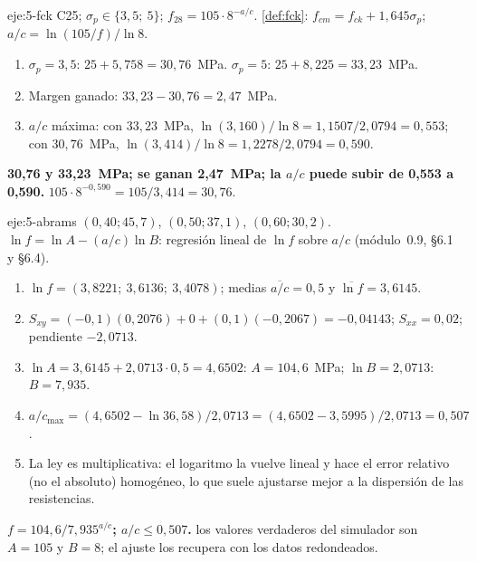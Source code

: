 \begin{solucion}{eje:5-fck}
\datos C25; $\sigma_p\in\{3{,}5;\ 5\}$; $f_{28}=105\cdot8^{-a/c}$.
\planteamiento \cref{def:fck}: $f_{cm}=f_{ck}+1{,}645\sigma_p$; $a/c=\ln(105/f)/\ln8$.
\pasos
\begin{enumerate}[label=\arabic*.]
  \item $\sigma_p=3{,}5$: $25+5{,}758=30{,}76$~MPa. $\sigma_p=5$: $25+8{,}225=33{,}23$~MPa.
  \item Margen ganado: $33{,}23-30{,}76=2{,}47$~MPa.
  \item $a/c$ máxima: con $33{,}23$~MPa, $\ln(3{,}160)/\ln8=1{,}1507/2{,}0794=0{,}553$; con $30{,}76$~MPa, $\ln(3{,}414)/\ln 8=1{,}2278/2{,}0794=0{,}590$.
\end{enumerate}
\resultado \textbf{30,76 y 33,23~MPa; se ganan 2,47~MPa; la $a/c$ puede subir de 0,553 a 0,590.}
\comprobacion $105\cdot8^{-0{,}590}=105/3{,}414=30{,}76$.
\end{solucion}

\begin{solucion}{eje:5-abrams}
\datos $(0{,}40;45{,}7)$, $(0{,}50;37{,}1)$, $(0{,}60;30{,}2)$.
\planteamiento $\ln f=\ln A-(a/c)\ln B$: regresión lineal de $\ln f$ sobre $a/c$ (módulo~0.9, §6.1 y §6.4).
\pasos
\begin{enumerate}[label=\arabic*.]
  \item $\ln f=(3{,}8221;\ 3{,}6136;\ 3{,}4078)$; medias $\overline{a/c}=0{,}5$ y $\overline{\ln f}=3{,}6145$.
  \item $S_{xy}=(-0{,}1)(0{,}2076)+0+(0{,}1)(-0{,}2067)=-0{,}04143$; $S_{xx}=0{,}02$; pendiente $-2{,}0713$.
  \item $\ln A=3{,}6145+2{,}0713\cdot0{,}5=4{,}6502$: $A=104{,}6$~MPa; $\ln B=2{,}0713$: $B=7{,}935$.
  \item $a/c_{\max}=(4{,}6502-\ln36{,}58)/2{,}0713=(4{,}6502-3{,}5995)/2{,}0713=0{,}507$.
  \item La ley es multiplicativa: el logaritmo la vuelve lineal y hace el error relativo (no el absoluto) homogéneo, lo que suele ajustarse mejor a la dispersión de las resistencias.
\end{enumerate}
\resultado \textbf{$f=104{,}6/7{,}935^{a/c}$; $a/c\le0{,}507$.}
\comprobacion los valores verdaderos del simulador son $A=105$ y $B=8$; el ajuste los recupera con los datos redondeados.
\end{solucion}

